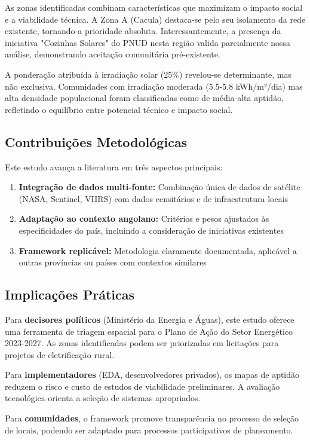 \documentclass[12pt, a4paper]{article}
\begin{document}
As zonas identificadas combinam características que maximizam o impacto social e a viabilidade técnica. A Zona A (Cacula) destaca-se pelo seu isolamento da rede existente, tornando-a prioridade absoluta. Interessantemente, a presença da iniciativa "Cozinhas Solares" do PNUD nesta região valida parcialmente nossa análise, demonstrando aceitação comunitária pré-existente.

A ponderação atribuída à irradiação solar (25\%) revelou-se determinante, mas não exclusiva. Comunidades com irradiação moderada (5.5-5.8 kWh/m²/dia) mas alta densidade populacional foram classificadas como de média-alta aptidão, refletindo o equilíbrio entre potencial técnico e impacto social.

\subsection{Contribuições Metodológicas}

Este estudo avança a literatura em três aspectos principais:
\begin{enumerate}
    \item \textbf{Integração de dados multi-fonte:} Combinação única de dados de satélite (NASA, Sentinel, VIIRS) com dados censitários e de infraestrutura locais
    \item \textbf{Adaptação ao contexto angolano:} Critérios e pesos ajustados às especificidades do país, incluindo a consideração de iniciativas existentes
    \item \textbf{Framework replicável:} Metodologia claramente documentada, aplicável a outras províncias ou países com contextos similares
\end{enumerate}

\subsection{Implicações Práticas}

Para \textbf{decisores políticos} (Ministério da Energia e Águas), este estudo oferece uma ferramenta de triagem espacial para o Plano de Ação do Setor Energético 2023-2027. As zonas identificadas podem ser priorizadas em licitações para projetos de eletrificação rural.

Para \textbf{implementadores} (EDA, desenvolvedores privados), os mapas de aptidão reduzem o risco e custo de estudos de viabilidade preliminares. A avaliação tecnológica orienta a seleção de sistemas apropriados.

Para \textbf{comunidades}, o framework promove transparência no processo de seleção de locais, podendo ser adaptado para processos participativos de planeamento.
\end{document}
